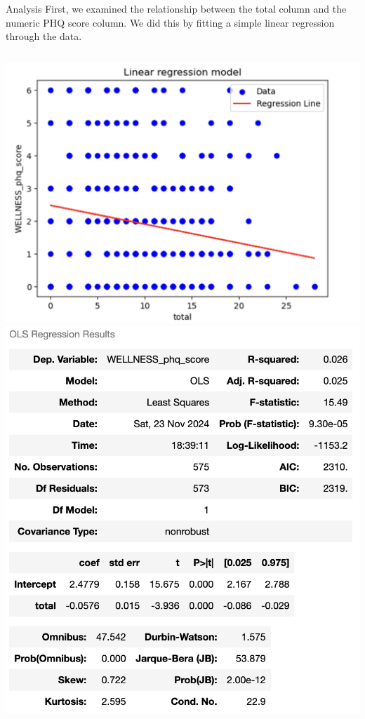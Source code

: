 \documentclass{beamer}
\begin{document}
\begin{frame}{Analysis}
    First, we examined the relationship between the total column and the numeric PHQ score column. We did this by fitting a simple linear regression through the data.
    \begin{columns}
        \includegraphics[width=1\linewidth]{model1.png}\\
        \includegraphics[width=1\linewidth]{summarystats.png}

        
    \end{columns}
\end{frame}
\end{document}
